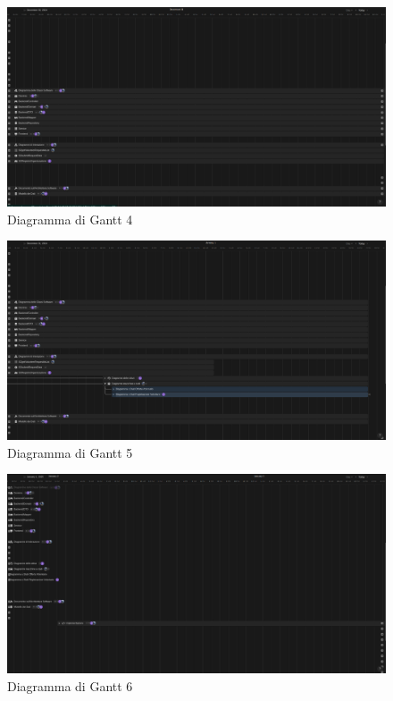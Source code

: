 \documentclass[12pt]{article}
\begin{document}
\begin{figure}[H]
    \includegraphics[width=\textwidth,keepaspectratio]{Immagini/Gantt/Iterazione 1/Gantt4.png}
        \caption{Diagramma di Gantt 4} 
        \label{fig:Gantt4}
\end{figure}

\begin{figure}[H]
    \includegraphics[width=\textwidth,keepaspectratio]{Immagini/Gantt/Iterazione 1/Gantt5.png}
        \caption{Diagramma di Gantt 5} 
        \label{fig:Gantt5}
\end{figure}

\begin{figure}[H]
    \includegraphics[width=\textwidth,keepaspectratio]{Immagini/Gantt/Iterazione 1/Gantt6.png}
        \caption{Diagramma di Gantt 6} 
        \label{fig:Gantt6}
\end{figure}
\end{document}
